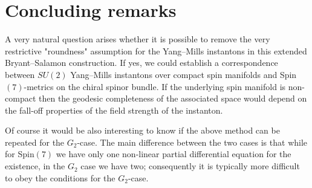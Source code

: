 \documentclass[a4paper,12pt,draft]{article}
\begin{document}
\section{Concluding remarks}
A very natural question arises whether it is possible to remove the
very restrictive "roundness" assumption for the Yang--Mills instantons in
this extended Bryant--Salamon construction. If yes, we could establish a
correspondence between $SU(2)$ Yang--Mills instantons over compact spin
manifolds and Spin$(7)$-metrics on the chiral spinor bundle. If the
underlying spin manifold is non-compact then the geodesic completeness of
the associated space would depend on the fall-off properties of the field
strength of the instanton.

Of course it would be also interesting to know if the above method can be
repeated for the $G_2$-case. The main difference between the two cases is
that while for Spin$(7)$ we have only one non-linear partial differential
equation for the existence, in the $G_2$ case we have two; consequently
it is typically more difficult to obey the conditions for the
$G_2$-case. 
\end{document}
